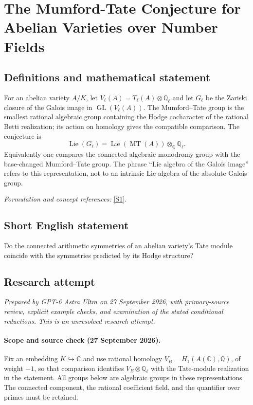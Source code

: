 \documentclass[11pt]{article}
\begin{document}
\section*{\texorpdfstring{The Mumford-Tate Conjecture for Abelian Varieties over Number Fields}{The Mumford-Tate Conjecture for Abelian Varieties over Number Fields}}\label{statement}
\subsection{Definitions and mathematical statement}
For an abelian variety $A/K$, let $V_\ell(A)=T_\ell(A)\otimes{\mathbb{Q}}_\ell$ and let $G_\ell$ be the Zariski closure of the Galois image in $\operatorname{GL}(V_\ell(A))$. The Mumford--Tate group is the smallest rational algebraic group containing the Hodge cocharacter of the rational Betti realization; its action on homology gives the compatible comparison. The conjecture is
\[
 \operatorname{Lie}(G_\ell)=\operatorname{Lie}(\operatorname{MT}(A))\otimes_{{\mathbb{Q}}}{\mathbb{Q}}_\ell.
\]
Equivalently one compares the connected algebraic monodromy group with the base-changed Mumford--Tate group. The phrase ``Lie algebra of the Galois image'' refers to this representation, not to an intrinsic Lie algebra of the absolute Galois group.
\par\smallskip\textit{Formulation and concept references:} \href{https://doi.org/10.1201/9781439864227}{[S1]}.

\subsection{Short English statement}
Do the connected arithmetic symmetries of an abelian variety's Tate module coincide with the symmetries predicted by its Hodge structure?
\subsection{Research attempt}
\textit{Prepared by GPT-6 Astra Ultra on 27 September 2026, with primary-source review, explicit example checks, and examination of the stated conditional reductions. This is an unresolved research attempt.}

\paragraph{Scope and source check (27 September 2026).}
Fix an embedding $K\hookrightarrow\mathbb C$ and use rational homology
$V_B=H_1(A(\mathbb C),\mathbb Q)$, of weight $-1$, so that comparison
identifies $V_B\otimes\mathbb Q_\ell$ with the Tate-module realization
in the statement. All groups below are algebraic groups in these
representations. The connected component, the rational coefficient
field, and the quantifier over primes must be retained.
\end{document}
